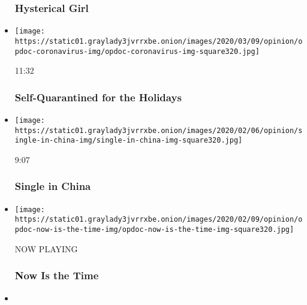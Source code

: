 \begin{itemize}
{  \subsubsection{Hysterical Girl}\label{hysterical-girl}}
\item
  \href{https://www.nytimes3xbfgragh.onion/video/opinion/100000007013675/self-quarantined-for-the-holidays.html?action=click\&module=video-series-bar\&region=header\&pgtype=Article\&playlistId=video/op-docs}{}

  \texttt{[image: https://static01.graylady3jvrrxbe.onion/images/2020/03/09/opinion/opdoc-coronavirus-img/opdoc-coronavirus-img-square320.jpg]}

  11:32

  \hypertarget{self-quarantined-for-the-holidays}{%
  \subsubsection{Self-Quarantined for the
  Holidays}\label{self-quarantined-for-the-holidays}}
\item
  \href{https://www.nytimes3xbfgragh.onion/video/opinion/100000006948977/single-in-china.html?action=click\&module=video-series-bar\&region=header\&pgtype=Article\&playlistId=video/op-docs}{}

  \texttt{[image: https://static01.graylady3jvrrxbe.onion/images/2020/02/06/opinion/single-in-china-img/single-in-china-img-square320.jpg]}

  9:07

  \hypertarget{single-in-china}{%
  \subsubsection{Single in China}\label{single-in-china}}
\item
  \texttt{[image: https://static01.graylady3jvrrxbe.onion/images/2020/02/09/opinion/opdoc-now-is-the-time-img/opdoc-now-is-the-time-img-square320.jpg]}

  NOW PLAYING

  \hypertarget{now-is-the-time-2}{%
  \subsubsection{Now Is the Time}\label{now-is-the-time-2}}
\item
  \href{https://www.nytimes3xbfgragh.onion/video/opinion/100000006923399/betye-saar-taking-care-of-business.html?action=click\&module=video-series-bar\&region=header\&pgtype=Article\&playlistId=video/op-docs}{}


\end{itemize}
